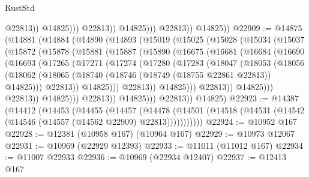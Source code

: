 \begin{lexlean}{RustStd}
\begin{coremodule}
                                @22813))
                            @14825)))
                      @22813))
                  @14825)))
            @22813))
        @14825))
@22909 := @14875
    (@14881
      (@14884
        (@14890
          (@14893
            (@15019
              (@15025
                (@15028
                  (@15034
                    (@15037
                      (@15872
                        (@15878
                          (@15881
                            (@15887
                              (@15890
                                (@16675
                                  (@16681
                                    (@16684
                                      (@16690
                                        (@16693
                                          (@17265
                                            (@17271
                                              (@17274
                                                (@17280
                                                  (@17283
                                                    (@18047
                                                      (@18053
                                                        (@18056
                                                          (@18062
                                                            (@18065
                                                              (@18740
                                                                (@18746
                                                                  (@18749 (@18755 @22861 @22813))
                                                                  @14825)))
                                                            @22813))
                                                        @14825)))
                                                  @22813))
                                              @14825)))
                                        @22813))
                                    @14825)))
                              @22813))
                          @14825)))
                    @22813))
                @14825)))
          @22813))
      @14825)
@22923 := @14387
    (@14412
      (@14453
        (@14455
          (@14457
            (@14478
              (@14501 (@14518 (@14531 (@14542 (@14546 (@14557 (@14562 @22909) @22813)))))))))))
@22924 := @10952 @167
@22928 := @12381 (@10958 @167) (@10964 @167)
@22929 := @10973 @12067
@22931 := @10969 (@22929 @12393)
@22933 := @11011 (@11012 @167)
@22934 := @11007 @22933
@22936 := @10969 (@22934 @12407)
@22937 := @12413 @167

\end{coremodule}
\end{lexlean}

